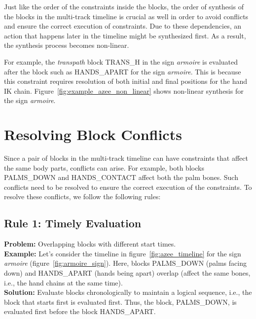\documentclass[../../main.tex]{subfiles}
\begin{document}
Just like the order of the constraints inside the blocks, the order of synthesis of the blocks in the multi-track timeline is crucial as well in order to avoid conflicts and ensure the correct execution of constraints. Due to these dependencies, an action that happens later in the timeline might be synthesized first. As a result, the synthesis process becomes non-linear.

For example, the \emph{transpath} block TRANS\_H in the sign \emph{armoire} is evaluated after the block such as HANDS\_APART for the sign \emph{armoire}. This is because this constraint requires resolution of both initial and final positions for the hand IK chain. Figure~\ref{fig:example_azee_non_linear} shows non-linear synthesis for the sign \emph{armoire}.

\section{Resolving Block Conflicts}
\label{ch:multi_track:resolve_conflicts}

Since a pair of blocks in the multi-track timeline can have constraints that affect the same body parts, conflicts can arise. For example, both blocks PALMS\_DOWN and HANDS\_CONTACT affect both the palm bones. Such conflicts need to be resolved to ensure the correct execution of the constraints. To resolve these conflicts, we follow the following rules:

\subsection{Rule 1: Timely Evaluation}
\label{ch:multi_track:resolve_conflicts:rule1}

\textbf{Problem:} Overlapping blocks with different start times. \\

\textbf{Example:} Let's consider the timeline in figure~\ref{fig:azee_timeline} for the sign \emph{armoire} (figure~\ref{fig:armoire_sign}). Here, blocks PALMS\_DOWN (palms facing down) and HANDS\_APART (hands being apart) overlap (affect the same bones, i.e., the hand chains at the same time).  \\

\textbf{Solution:} Evaluate blocks chronologically to maintain a logical sequence, i.e., the block that starts first is evaluated first. Thus, the block, PALMS\_DOWN, is evaluated first before the block HANDS\_APART.  \\
\end{document}
